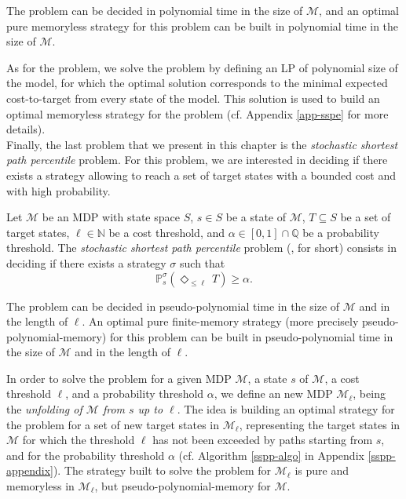 \begin{theorem}
  The \SSPE{} problem can be decided in polynomial time in the size of $\mathcal{M}$, %
  and an optimal pure memoryless strategy for this problem can be built in polynomial time in the size of $\mathcal{M}$. %
\end{theorem}

As for the \SR{} problem, we solve the problem by defining an LP of polynomial size of the model, for which the optimal solution corresponds to the minimal expected cost-to-target from every state of the model.
This solution is used to build an optimal memoryless strategy for the problem (cf. Appendix \ref{app-sspe} for more details).\\

Finally, the last problem that we present in this chapter is the
\textit{stochastic shortest path percentile} problem. For this problem, we
are interested in deciding if there exists a strategy allowing to reach a set of target states with
a bounded cost and with high probability.

\begin{definition}\label{sspp-def}
  Let $\mathcal{M}$ be an MDP with state space $S$, $s \in S$ be a state of
  $\mathcal{M}$, $T \subseteq S$ be a set of target states, $\ell \in \mathbb{N}$
  be a cost threshold, and $\alpha \in [0, 1] \cap \mathbb{Q}$ be a probability
  threshold. The \textit{stochastic shortest path percentile} problem (\SSPP{}, for short)
  consists in deciding if there exists a strategy $\sigma$ such that
  \[
    \mathbb{P}_s^\sigma (\Diamond_{\leq \ell}\, T) \geq \alpha.
  \]
\end{definition}

\begin{theorem}\label{sspp-thm}
  The \SSPP{} problem can be decided in pseudo-polynomial time in the size of $\mathcal{M}$ and in the length of $\ell$.
  An optimal pure finite-memory strategy (more precisely pseudo-polynomial-memory) for this problem can be built in pseudo-polynomial time in the size of $\mathcal{M}$ and in the length of $\ell$.
\end{theorem}

In order to solve the \SSPP{} problem for a given MDP $\mathcal{M}$, a state $s$ of $\mathcal{M}$, a cost threshold $\ell$, and a probability threshold $\alpha$, we define an new MDP $\mathcal{M}_\ell$, being the \textit{unfolding of $\mathcal{M}$ from $s$ up to $\ell$}.
The idea is building an optimal strategy for the \SR{} problem for a set of new target states in $\mathcal{M}_\ell$, representing the target states in $\mathcal{M}$ for which the threshold $\ell$ has not been exceeded by paths starting from $s$, and for the probability threshold $\alpha$ (cf. Algorithm \ref{sspp-algo} in Appendix \ref{sspp-appendix}).
The strategy built to solve the \SR{} problem for $\mathcal{M}_\ell$ is pure and memoryless in $\mathcal{M}_\ell$, but pseudo-polynomial-memory for $\mathcal{M}$.

